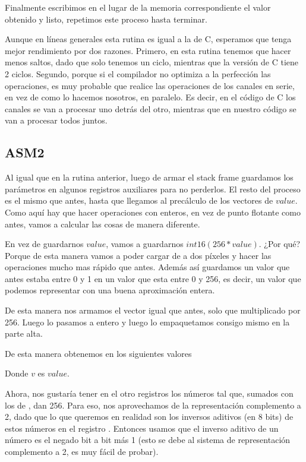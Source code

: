 Finalmente escribimos en el lugar de la memoria correspondiente el valor obtenido y listo, repetimos este proceso hasta terminar.

Aunque en líneas generales esta rutina es igual a la de C, esperamos que tenga mejor rendimiento por dos razones.
Primero, en esta rutina tenemos que hacer menos saltos, dado que solo tenemos un ciclo, mientras que la versión de C tiene 2 ciclos.
Segundo, porque si el compilador no optimiza a la perfección las operaciones, es muy probable que realice las operaciones de los canales en serie, en vez de como lo hacemos nosotros, en paralelo.
Es decir, en el código de C los canales se van a procesar uno detrás del otro, mientras que en nuestro código se van a procesar todos juntos.


\subsection{ASM2}

Al igual que en la rutina anterior, luego de armar el stack frame guardamos los parámetros en algunos registros auxiliares para no perderlos. El resto del proceso es el mismo que antes, hasta que llegamos al precálculo de los vectores de $value$. Como aquí hay que hacer operaciones con enteros, en vez de punto flotante como antes, vamos a calcular las cosas de manera diferente.

En vez de guardarnos $value$, vamos a guardarnos $int16(256*value)$. ¿Por qué? Porque de esta manera vamos a poder cargar de a dos píxeles y hacer las operaciones mucho mas rápido que antes. Además así guardamos un valor que antes estaba entre 0 y 1 en un valor que esta entre 0 y 256, es decir, un valor que podemos representar con una buena aproximación entera.

De esta manera nos armamos el vector igual que antes, solo que multiplicado por 256. Luego lo pasamos a entero y luego lo empaquetamos consigo mismo en la parte alta.

De esta manera obtenemos en  los siguientes valores


Donde $v$ es $value$.


Ahora, nos gustaría tener en el otro registros los números tal que, sumados con los de , dan 256. Para eso, nos aprovechamos de la representación complemento a 2, dado que lo que queremos en realidad son los inversos aditivos (en 8 bits) de estos números en el registro . Entonces usamos que el inverso aditivo de un número es el negado bit a bit más 1 (esto se debe al sistema de representación complemento a 2, es muy fácil de probar).

